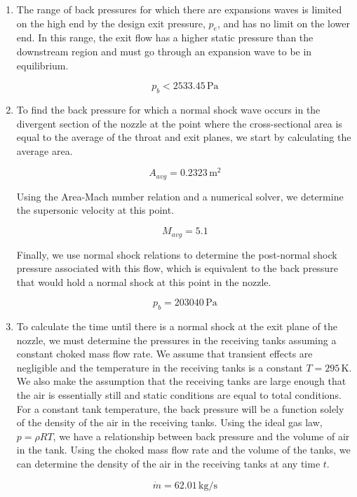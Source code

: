 \documentclass[../main.tex]{subfiles}
\begin{document}
\begin{enumerate}[label=(\alph*)]
    \item The range of back pressures for which there are expansions waves is limited on the high end by the design exit pressure, \(p_e\), and has no limit on the lower end.
    In this range, the exit flow has a higher static pressure than the downstream region and must go through an expansion wave to be in equilibrium.

    \[
        \boxed{p_{b} < 2533.45\,\unit{\pascal}}
    \]

    \item To find the back pressure for which a normal shock wave occurs in the divergent section of the nozzle at the point where the cross-sectional area is equal to the average of the throat and exit planes, we start by calculating the average area.
    
    \[
        A_{avg} = 0.2323 \, \unit{\meter\squared}
    \]

    Using the Area-Mach number relation and a numerical solver, we determine the supersonic velocity at this point.

    \[
        M_{avg} = 5.1  
    \]
    
    Finally, we use normal shock relations to determine the post-normal shock pressure associated with this flow, which is equivalent to the back pressure that would hold a normal shock at this point in the nozzle.

    \[
        \boxed{p_b = 203040\, \unit{\pascal}}  
    \]

    \item To calculate the time until there is a normal shock at the exit plane of the nozzle, we must determine the pressures in the receiving tanks assuming a constant choked mass flow rate.
    We assume that transient effects are negligible and the temperature in the receiving tanks is a constant \(T=295\,\unit{\kelvin}\).
    We also make the assumption that the receiving tanks are large enough that the air is essentially still and static conditions are equal to total conditions.
    For a constant tank temperature, the back pressure will be a function solely of the density of the air in the receiving tanks.
    Using the ideal gas law, \(p = \rho R T\), we have a relationship between back pressure and the volume of air in the tank. 
    Using the choked mass flow rate and the volume of the tanks, we can determine the density of the air in the receiving tanks at any time \(t\).

    \[
        \dot{m} = 62.01 \,\unit{\kilogram/\second}
    \]


\end{enumerate}
\end{document}
